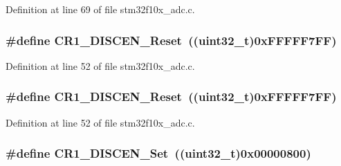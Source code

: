 Definition at line 69 of file stm32f10x\+\_\+adc.\+c.

\subsubsection[{\texorpdfstring{C\+R1\+\_\+\+D\+I\+S\+C\+E\+N\+\_\+\+Reset}{CR1_DISCEN_Reset}}]{\setlength{\rightskip}{0pt plus 5cm}\#define C\+R1\+\_\+\+D\+I\+S\+C\+E\+N\+\_\+\+Reset~(({\bf uint32\+\_\+t})0x\+F\+F\+F\+F\+F7\+F\+F)}\hypertarget{group___a_d_c___private___defines_ga959f617e77853bff85ca5e8d6fba6611}{}\label{group___a_d_c___private___defines_ga959f617e77853bff85ca5e8d6fba6611}


Definition at line 52 of file stm32f10x\+\_\+adc.\+c.

\subsubsection[{\texorpdfstring{C\+R1\+\_\+\+D\+I\+S\+C\+E\+N\+\_\+\+Reset}{CR1_DISCEN_Reset}}]{\setlength{\rightskip}{0pt plus 5cm}\#define C\+R1\+\_\+\+D\+I\+S\+C\+E\+N\+\_\+\+Reset~(({\bf uint32\+\_\+t})0x\+F\+F\+F\+F\+F7\+F\+F)}\hypertarget{group___a_d_c___private___defines_ga959f617e77853bff85ca5e8d6fba6611}{}\label{group___a_d_c___private___defines_ga959f617e77853bff85ca5e8d6fba6611}


Definition at line 52 of file stm32f10x\+\_\+adc.\+c.

\subsubsection[{\texorpdfstring{C\+R1\+\_\+\+D\+I\+S\+C\+E\+N\+\_\+\+Set}{CR1_DISCEN_Set}}]{\setlength{\rightskip}{0pt plus 5cm}\#define C\+R1\+\_\+\+D\+I\+S\+C\+E\+N\+\_\+\+Set~(({\bf uint32\+\_\+t})0x00000800)}\hypertarget{group___a_d_c___private___defines_ga95f4f653adde3407c116919c2b7d9c74}{}\label{group___a_d_c___private___defines_ga95f4f653adde3407c116919c2b7d9c74}


